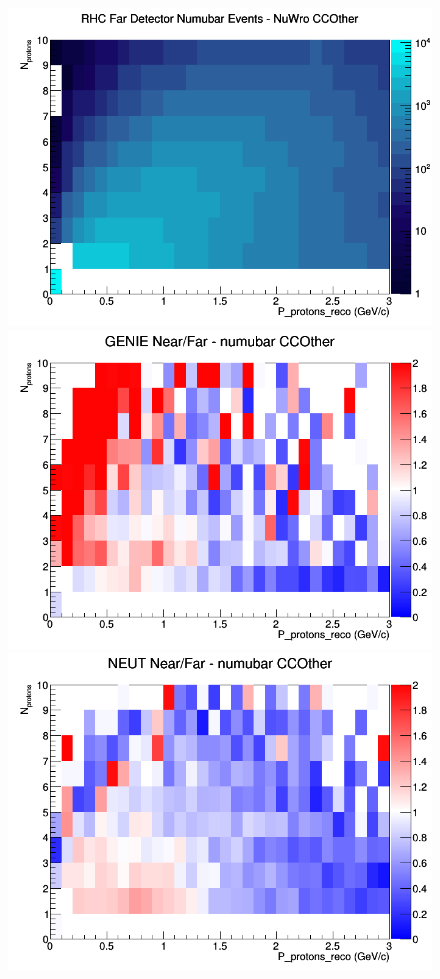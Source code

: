 \begin{figure}[h]
\endminipage
{}
\includegraphics[width=\linewidth]{eff_N_P/GAr/protons/CCOther_RHC_FD_numubar_N_P_NuWro.png}
\endminipage
\newline
{}
\includegraphics[width=\linewidth]{eff_N_P/GAr/protons/ratios/CCOther_GENIE_numubar_NF_N_P.png}
\endminipage
{}
\includegraphics[width=\linewidth]{eff_N_P/GAr/protons/ratios/CCOther_NEUT_numubar_NF_N_P.png}

\end{figure}

